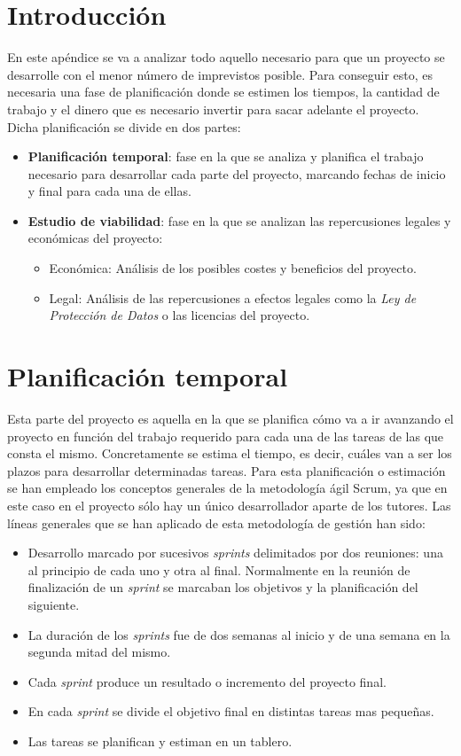 
\section{Introducción}
En este apéndice se va a analizar todo aquello necesario para que un proyecto se desarrolle con el menor número de imprevistos posible. Para conseguir esto, es necesaria una fase de planificación donde se estimen los tiempos, la cantidad de trabajo y el dinero que es necesario invertir para sacar adelante el proyecto.
Dicha planificación se divide en dos partes:
\begin{itemize}
	\item \textbf{Planificación temporal}: fase en la que se analiza y planifica el trabajo necesario para desarrollar cada parte del proyecto, marcando fechas de inicio y final para cada una de ellas.
	\item \textbf{Estudio de viabilidad}: fase en la que se analizan las repercusiones legales y económicas del proyecto:
	\begin{itemize}
		\item Económica: Análisis de los posibles costes y beneficios del proyecto.
		\item Legal: Análisis de las repercusiones a efectos legales como la \textit{Ley de Protección de Datos} o las licencias del proyecto.
	\end{itemize}
\end{itemize}

\section{Planificación temporal}
Esta parte del proyecto es aquella en la que se planifica cómo va a ir avanzando el proyecto en función del trabajo requerido para cada una de las tareas de las que consta el mismo.
Concretamente se estima el tiempo, es decir, cuáles van a ser los plazos para desarrollar determinadas tareas.
Para esta planificación o estimación se han empleado los conceptos generales de la metodología ágil Scrum, ya que en este caso en el proyecto sólo hay un único desarrollador aparte de los tutores. Las líneas generales que se han aplicado de esta metodología de gestión han sido:
\begin{itemize}
	\tightlist
	\item
	Desarrollo marcado por sucesivos \emph{sprints} delimitados por dos reuniones: una al principio de cada uno y otra al final. Normalmente en la reunión de finalización de un \emph{sprint} se marcaban los objetivos y la planificación del siguiente.
	\item
	La duración de los \emph{sprints} fue de dos semanas al inicio y de una semana en la segunda mitad del mismo.
	\item
	Cada \emph{sprint} produce un resultado o incremento del proyecto final.
	\item
	En cada \emph{sprint} se divide el objetivo final en distintas tareas mas pequeñas.
	\item
	Las tareas se planifican y estiman en un tablero.
\end{itemize}

